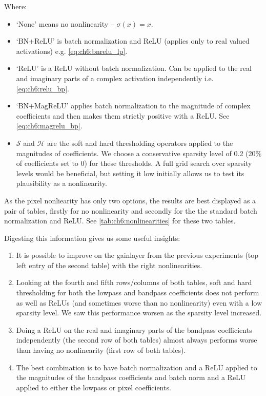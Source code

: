 Where:
\begin{itemize}
  \item `None' means no nonlinearity -- $\sigma(x) = x$.
  \item `BN+ReLU' is batch normalization and ReLU (applies only to real valued
    activations) e.g. \eqref{eq:ch6:bnrelu_lp}.
  \item `ReLU' is a ReLU without batch normalization. Can be applied to the real
    and imaginary parts of a complex activation independently i.e.
    \eqref{eq:ch6:relu_bp}.
  \item `BN+MagReLU' applies batch normalization to the magnitude of complex
    coefficients and then makes them strictly positive with a ReLU. See
    \eqref{eq:ch6:magrelu_bp}.
  \item $\mathcal{S}$ and $\mathcal{H}$ are the soft and hard thresholding
    operators applied to the magnitudes of coefficients. We choose a
    conservative sparsity level of 0.2 (20\% of coefficients set to 0) for these
    thresholds. A full grid search over
    sparsity levels would be beneficial, but setting it low initially allows us
    to test its plausibility as a nonlinearity.
\end{itemize}

As the pixel nonliearity has only two options, the results are best displayed as
a pair of tables, firstly for no nonlinearity and secondly for the
the standard batch normalization and ReLU. See
\autoref{tab:ch6:nonlinearities} for these two tables. 

Digesting this information gives us some useful insights: 
\begin{enumerate}
  \item It is possible to improve on the gainlayer from the previous experiments
    (top left entry of the second table) with the right nonlinearities.
  \item Looking at the fourth and fifth rows/columns of both tables, soft and
    hard thresholding for both the lowpass and bandpass coefficients does not perform as
    well as ReLUs (and sometimes worse than no nonlinearity) even with a low
    sparsity level. We saw this performance worsen as the sparsity level
    increased.
  \item Doing a ReLU on the real and imaginary parts of the bandpass
    coefficients independently (the second row of both tables) almost always
    performs worse than having no nonlinearity (first row of both tables).
  \item The best combination is to have batch normalization and a ReLU applied
    to the magnitudes of the bandpass coefficients and batch norm and a ReLU
    applied to either the lowpass or pixel coefficients. 
\end{enumerate}

